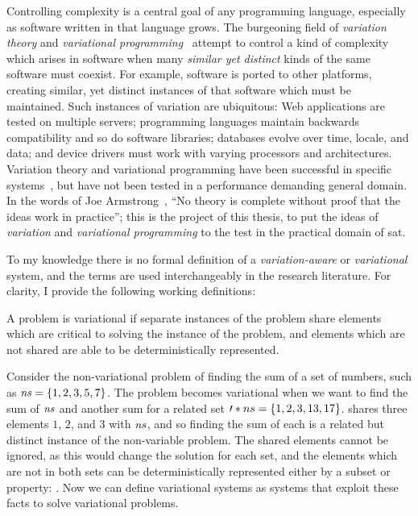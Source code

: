 \label{chapter:introduction}%
%
Controlling complexity is a central goal of any programming language, especially
as software written in that language grows. The burgeoning field of
\emph{variation theory} and \emph{variational
  programming}~\cite{EW11gttse,EW11tosem,HW16fosd,CEW16ecoop,Walk14onward}
attempt to control a kind of complexity which arises in software when many
\emph{similar yet distinct} kinds of the same software must coexist. For
example, software is ported to other platforms, creating similar, yet distinct
instances of that software which must be maintained. Such instances of variation
are ubiquitous: Web applications are tested on multiple servers; programming
languages maintain backwards compatibility and so do software libraries;
databases evolve over time, locale, and data; and device drivers must work with
varying processors and architectures. Variation theory and variational
programming have been successful in specific
systems~\cite{ES18diagrams,SE17fosd,MMWWK17vamos}, but have not been tested in a
performance demanding general domain. In the words of Joe
Armstrong~\cite{armstrongThesis}, ``No theory is complete without proof that the
ideas work in practice''; this is the project of this thesis, to put the ideas
of \emph{variation} and \emph{variational programming} to the test in the
practical domain of \acl{sat}.

To my knowledge there is no formal definition of a \emph{variation-aware} or
\emph{variational} system, and the terms are used interchangeably in the
research literature. For clarity, I provide the following working definitions:

\begin{definition}
  A problem is variational if separate instances of the problem share elements
  which are critical to solving the instance of the problem, and elements which
  are not shared are able to be deterministically represented.
\end{definition}
%
Consider the non-variational problem of finding the sum of a set of numbers,
such as $\kf{ns} = \set{1,2,3,5,7}$. The problem becomes variational when we
want to find the sum of $\mathit{ns}$ and another sum for a related set $\prime*{ns}
= \set{1,2,3,13,17}$.  shares three elements $1$, $2$, and $3$ with
$\mathit{ns}$, and so finding the sum of each is a related but distinct instance of
the non-variable problem. The shared elements cannot be ignored, as this would
change the solution for each set, and the elements which are not in both sets
can be deterministically represented either by a subset or property: .
%
Now we can define variational systems as systems that exploit these facts to
solve variational problems.

